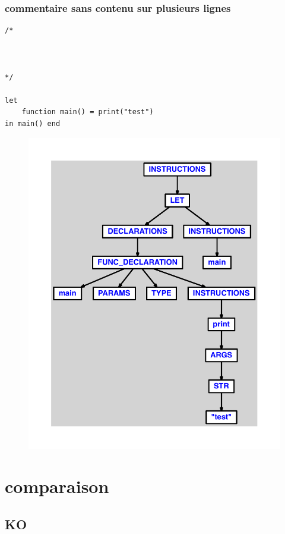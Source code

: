 \documentclass{article}
\begin{document}
\subsubsection{commentaire sans contenu sur plusieurs lignes}
\begin{lstlisting}
/*



*/

let
	function main() = print("test")
in main() end
\end{lstlisting}
\newpage
\begin{figure}[H]
\centering
\includegraphics[max width=\textwidth]{ast/ast_163.pdf}
\end{figure}
\newpage
\section{comparaison}
\subsection{KO}
\end{document}

